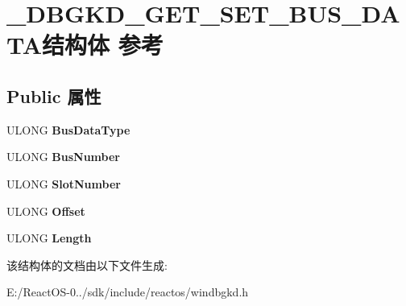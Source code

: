 \hypertarget{struct___d_b_g_k_d___g_e_t___s_e_t___b_u_s___d_a_t_a}{}\section{\+\_\+\+D\+B\+G\+K\+D\+\_\+\+G\+E\+T\+\_\+\+S\+E\+T\+\_\+\+B\+U\+S\+\_\+\+D\+A\+T\+A结构体 参考}
\label{struct___d_b_g_k_d___g_e_t___s_e_t___b_u_s___d_a_t_a}
\subsection*{Public 属性}
\begin{DoxyCompactItemize}
\item 
\mbox{\label{struct___d_b_g_k_d___g_e_t___s_e_t___b_u_s___d_a_t_a_af155c18176b96e211833a9c40a258859}} 
U\+L\+O\+NG {\bfseries Bus\+Data\+Type}
\item 
\mbox{\label{struct___d_b_g_k_d___g_e_t___s_e_t___b_u_s___d_a_t_a_a51c99b2d8be1d51f453bfa8e7d1d37a5}} 
U\+L\+O\+NG {\bfseries Bus\+Number}
\item 
\mbox{\label{struct___d_b_g_k_d___g_e_t___s_e_t___b_u_s___d_a_t_a_accd2c52c492d209f7fdefb0576c9317c}} 
U\+L\+O\+NG {\bfseries Slot\+Number}
\item 
\mbox{\label{struct___d_b_g_k_d___g_e_t___s_e_t___b_u_s___d_a_t_a_acb8d6adff502f7790a5ede084918034c}} 
U\+L\+O\+NG {\bfseries Offset}
\item 
\mbox{\label{struct___d_b_g_k_d___g_e_t___s_e_t___b_u_s___d_a_t_a_a0a6af5191b137f012c935c970965632f}} 
U\+L\+O\+NG {\bfseries Length}
\end{DoxyCompactItemize}


该结构体的文档由以下文件生成\+:\begin{DoxyCompactItemize}
\item 
E\+:/\+React\+O\+S-\/0../sdk/include/reactos/windbgkd.\+h\end{DoxyCompactItemize}
